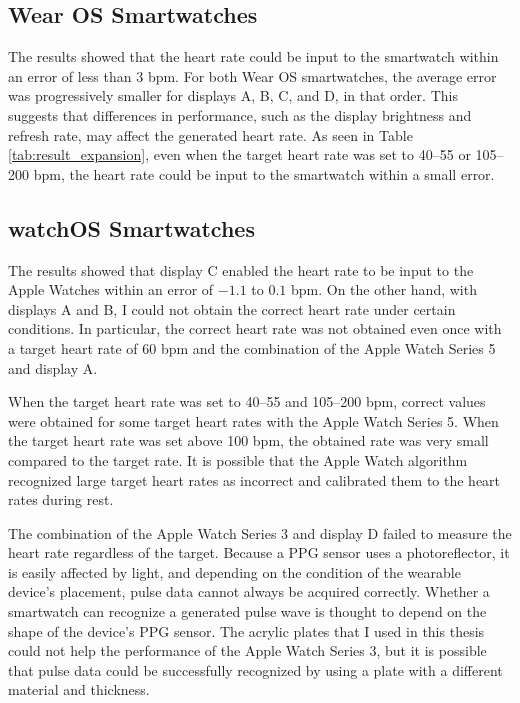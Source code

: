 \subsection{Wear OS Smartwatches}
The results showed that the heart rate could be input to the smartwatch within an error of less than $3$ bpm. For both Wear OS smartwatches, the average error was progressively smaller for displays A, B, C, and D, in that order. This suggests that differences in performance, such as the display brightness and refresh rate, may affect the generated heart rate. As seen in Table \ref{tab:result_expansion}, even when the target heart rate was set to 40--55 or 105--200 bpm, the heart rate could be input to the smartwatch within a small error.

\subsection{watchOS Smartwatches}
The results showed that display C enabled the heart rate to be input to the Apple Watches within an error of $-1.1$ to $0.1$ bpm. On the other hand, with displays A and B, I could not obtain the correct heart rate under certain conditions. In particular, the correct heart rate was not obtained even once with a target heart rate of 60 bpm and the combination of the Apple Watch Series 5 and display A.\par

When the target heart rate was set to 40--55 and 105--200 bpm, correct values were obtained for some target heart rates with the Apple Watch Series 5. When the target heart rate was set above 100 bpm, the obtained rate was very small compared to the target rate. It is possible that the Apple Watch algorithm recognized large target heart rates as incorrect and calibrated them to the heart rates during rest.\par

The combination of the Apple Watch Series 3 and display D failed to measure the heart rate regardless of the target. Because a PPG sensor uses a photoreflector, it is easily affected by light, and depending on the condition of the wearable device's placement, pulse data cannot always be acquired correctly. Whether a smartwatch can recognize a generated pulse wave is thought to depend on the shape of the device's PPG sensor. The acrylic plates that I used in this thesis could not help the performance of the Apple Watch Series 3, but it is possible that pulse data could be successfully recognized by using a plate with a different material and thickness.

